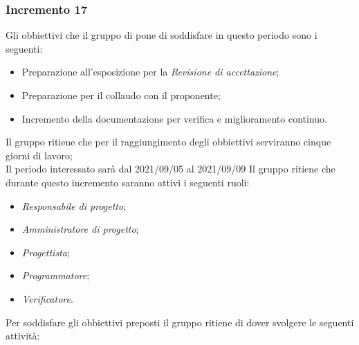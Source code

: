 \subsubsection{Incremento 17}
Gli obbiettivi che il gruppo di pone di soddisfare in questo periodo sono i seguenti:
\begin{itemize}
    \item Preparazione all'esposizione per la \textit{Revisione di accettazione};
    \item Preparazione per il collaudo con il proponente;
    \item Incremento della documentazione per verifica e miglioramento continuo.
\end{itemize}
Il gruppo ritiene che per il raggiungimento degli obbiettivi serviranno cinque giorni di lavoro;\\
Il periodo interessato sarà dal 2021/09/05 al 2021/09/09
Il gruppo ritiene che durante questo incremento saranno attivi i seguenti ruoli:
\begin{itemize}
    \item \textit{Responsabile di progetto};
    \item \textit{Amministratore di progetto};
    \item \textit{Progettista};
    \item \textit{Programmatore};
    \item \textit{Verificatore}.
\end{itemize}
Per soddisfare gli obbiettivi preposti il gruppo ritiene di dover svolgere le seguenti attività:
